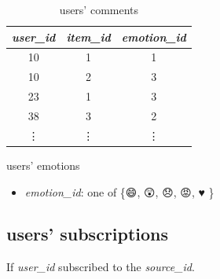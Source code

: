 \documentclass{article}
\begin{document}
\begin{table}[h]
    \parbox{.45\textwidth}{
        \centering
        \begin{tabular}{ccc}
            \toprule

            \emph{user\_id} & \emph{item\_id} & \emph{emotion\_id} \\\midrule
            10 & 1 & 1  \\
            10 & 2 & 3        \\
            23 & 1 & 3        \\
            38 & 3 & 2        \\
            \vdots & \vdots & \vdots  \\\bottomrule

        \end{tabular}
        \caption{users' emotions}
        \label{tab:emotion}
    }
    \hfill
    \parbox{.45\textwidth}{
        \centering
        \caption{users' comments}
        \label{tab:comment}
        }
\end{table}   

\begin{itemize}
    \item \emph{emotion\_id}: one of \{{\DejaSans 😄, 😲, 😞, 😡, ♥ }\}
\end{itemize}




\subsection*{users' subscriptions}

If \emph{user\_id} subscribed to the \emph{source\_id}.
\end{document}
